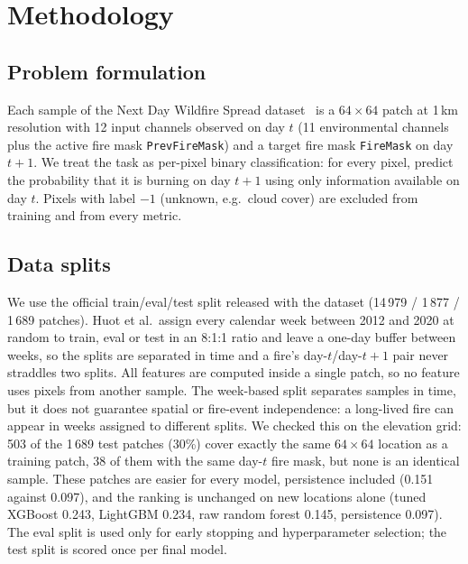 
\section{Methodology}
\label{sec:method}

\subsection{Problem formulation}
Each sample of the Next Day Wildfire Spread dataset~\cite{huot2022} is a $64\times64$ patch at
1\,km resolution with 12 input channels observed on day $t$ (11 environmental channels plus the
active fire mask \texttt{PrevFireMask}) and a target fire mask \texttt{FireMask} on day $t+1$.
We treat the task as per-pixel binary classification: for every pixel, predict the probability
that it is burning on day $t+1$ using only information available on day $t$.
Pixels with label $-1$ (unknown, e.g.\ cloud cover) are excluded from training and from every metric.

\subsection{Data splits}
We use the official train/eval/test split released with the dataset
(14\,979 / 1\,877 / 1\,689 patches). Huot et al.\ assign every calendar week between 2012 and 2020
at random to train, eval or test in an 8:1:1 ratio and leave a one-day buffer between weeks, so
the splits are separated in time and a fire's day-$t$/day-$t{+}1$ pair never straddles two splits.
All features are computed inside a single patch, so no feature uses pixels from another sample. The
week-based split separates samples in time, but it does not guarantee spatial or fire-event
independence: a long-lived fire can appear in weeks assigned to different splits. We checked this on
the elevation grid: 503 of the 1\,689 test patches (30\%) cover exactly the same $64\times64$ location as
a training patch, 38 of them with the same day-$t$ fire mask, but none is an identical sample. These
patches are easier for every model, persistence included (0.151 against 0.097), and the ranking is
unchanged on new locations alone (tuned XGBoost 0.243, LightGBM 0.234, raw random forest 0.145,
persistence 0.097).
The eval split is used only for early stopping and hyperparameter selection;
the test split is scored once per final model.


